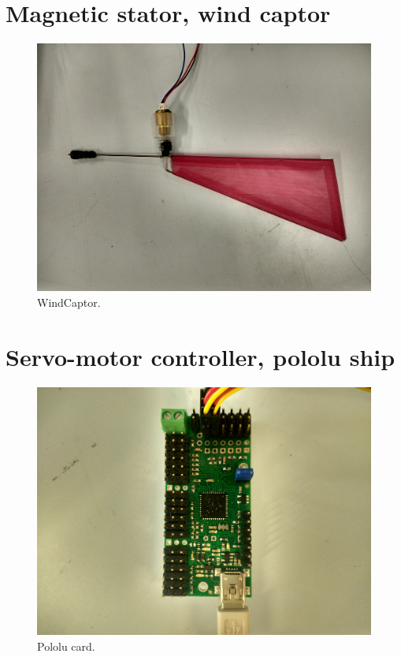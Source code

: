 \section{Magnetic stator, wind captor}

\begin{figure}[H]
\centering
    \includegraphics[scale=0.05,angle=0]{Images/WindCaptor.jpg}
    \caption{WindCaptor.}
    \label{fig:WindCaptor}
\end{figure}

\section{Servo-motor controller, pololu ship}

\begin{figure}[H]
\centering
    \includegraphics[scale=0.05,angle=0]{Images/Pololu.jpg}
    \caption{Pololu card.}
    \label{fig:Pololu}
\end{figure}

